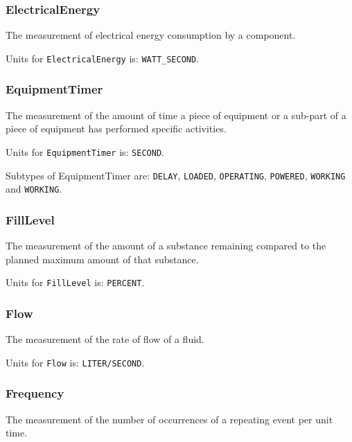 \subsubsection{ElectricalEnergy}
  \label{sec:ElectricalEnergy}


The measurement of electrical energy consumption by a component.


Units for \texttt{ElectricalEnergy} is: \texttt{WATT_SECOND}.

\FloatBarrier

\subsubsection{EquipmentTimer}
  \label{sec:EquipmentTimer}


The measurement of the amount of time a piece of equipment or a sub-part of a piece of equipment has performed specific activities.


Units for \texttt{EquipmentTimer} is: \texttt{SECOND}.


Subtypes of EquipmentTimer are: \texttt{DELAY}, \texttt{LOADED}, \texttt{OPERATING}, \texttt{POWERED}, \texttt{WORKING} and \texttt{WORKING}. 
\FloatBarrier

\subsubsection{FillLevel}
  \label{sec:FillLevel}


The measurement of the amount of a substance remaining compared to the planned maximum amount of that substance.


Units for \texttt{FillLevel} is: \texttt{PERCENT}.

\FloatBarrier

\subsubsection{Flow}
  \label{sec:Flow}


The measurement of the rate of flow of a fluid.


Units for \texttt{Flow} is: \texttt{LITER/SECOND}.

\FloatBarrier

\subsubsection{Frequency}
  \label{sec:Frequency}


The measurement of the number of occurrences of a repeating event per unit time.


